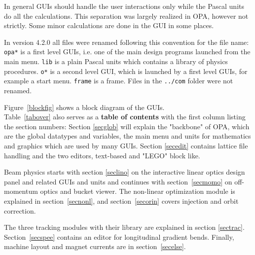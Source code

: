 \documentclass[12pt]{article}
\newcommand\code[1]{{\tt #1}}
\begin{document}
In general GUIs should handle the user interactions only while the Pascal units do all the calculations. This separation was largely realized in OPA, however not strictly. Some minor calculations are done in the GUI in some places.

In version 4.2.0 all files were renamed following this convention for the file name: 
\code{opa*} is a first level GUIs, i.e. one of the main design programs launched from the main menu. \code{*lib} is a plain Pascal units which contains a library of physics procedures. 
\code{o*} is a second level GUI, which is launched by a first level GUIs, for example a start menu. \code{*frame} is a frame. Files in the \code{../com} folder were not renamed. 

Figure~\ref{blockfig} shows a block diagram of the GUIs. \\

Table~\ref{tabover} also serves as a {\bf table of contents} with the first column listing the section numbers:
Section \ref{secglob} will explain the "backbone" of OPA, which are the global datatypes and variables, the main menu and units for mathematics and graphics which are used by many GUIs. 
Section \ref{secedit} contains lattice file handling and the two editors, text-based and "LEGO" block like.

Beam physics starts with section \ref{seclino} on the interactive linear optics design panel and related GUIs and units and continues with section~\ref{secmomo} on off-momentum optics and bucket viewer. The non-linear optimization module is explained in section~\ref{secnonl}, and section~\ref{secorin} covers injection and orbit correction.

The three tracking modules with their library are explained in section \ref{sectrac}. Section~\ref{secspee} contains an editor for longitudinal gradient bends. Finally, machine layout and magnet currents are in section~\ref{secelse}.
\end{document}
